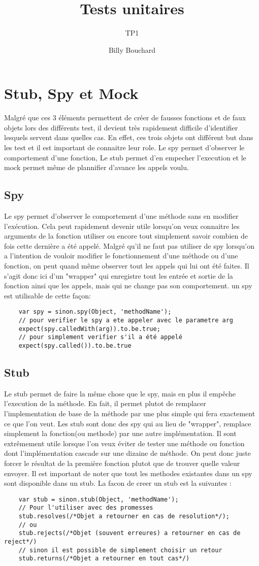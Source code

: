\documentclass{article}
\title{Tests unitaires}
\subtitle{TP1}
\author{Billy Bouchard}{Jacob Dorais}{}
\begin{document}
\maketitle
\section*{Stub, Spy et Mock}
Malgré que ces 3 éléments permettent de créer de fausses fonctions et de faux objets lors des différents test, il devient très rapidement difficile d'identifier lesquels servent dans quelles cas.
En effet, ces trois objets ont différent but dans les test et il est important de connaitre leur role.
Le spy permet d'observer le comportement d'une fonction,
Le stub permet d'en empecher l'execution et le mock permet même de plannifier d'avance les appels voulu.
\subsection*{Spy}
Le spy permet d'observer le comportement d'une méthode sans en modifier l'exécution.
Cela peut rapidement devenir utile lorsqu'on veux connaitre les arguments de la fonction utiliser ou encore tout simplement savoir combien de fois cette dernière a été appelé.
Malgré qu'il ne faut pas utiliser de spy lorsqu'on a l'intention de vouloir modifier le fonctionnement d'une méthode ou d'une fonction, on peut quand même observer tout les appels qui lui ont été faites.
Il s'agit donc ici d'un "wrapper" qui enregistre tout les entrée et sortie de la fonction ainsi que les appels, mais qui ne change pas son comportement.
un spy est utilisable de cette façon:
\begin{lstlisting}
	var spy = sinon.spy(Object, 'methodName');
	// pour verifier le spy a ete appeler avec le parametre arg
	expect(spy.calledWith(arg)).to.be.true;
	// pour simplement verifier s'il a été appelé
	expect(spy.called()).to.be.true
\end{lstlisting}
\subsection*{Stub}
Le stub permet de faire la même chose que le spy, mais en plus il empêche l'execution de la méthode.
En fait, il permet plutot de remplacer l'implementation de base de la méthode par une plus simple qui fera exactement ce que l'on veut.
Les stub sont donc des spy qui au lieu de "wrapper", remplace simplement la fonction(ou methode) par une autre implémentation.
Il sont extrêmement utile lorsque l'on veux éviter de tester une  méthode ou fonction dont l'implémentation cascade sur une dizaine de méthode.
On peut donc juste forcer le résultat de la première fonction plutot que de trouver quelle valeur envoyer.
Il est important de noter que tout les methodes existantes dans un spy sont disponible dans un stub.
La facon de creer un stub est la suivantes :
\begin{lstlisting}
	var stub = sinon.stub(Object, 'methodName');
	// Pour l'utiliser avec des promesses
	stub.resolves(/*Objet a retourner en cas de resolution*/);
	// ou
	stub.rejects(/*Objet (souvent erreures) a retourner en cas de reject*/)
	// sinon il est possible de simplement choisir un retour
	stub.returns(/*Objet a retourner en tout cas*/)
\end{lstlisting}
\end{document}
